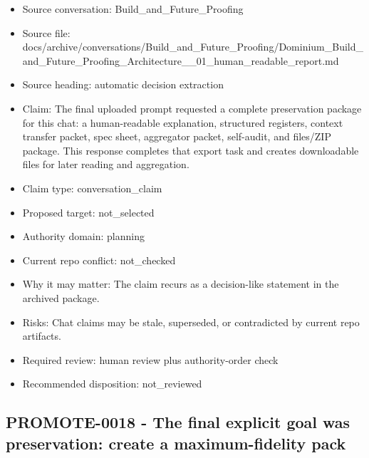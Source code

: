 \documentclass[11pt,a4paper]{report}
\begin{document}
\begin{itemize}
\item Source conversation: Build\_and\_Future\_Proofing
\item Source file: docs/archive/conversations/Build\_and\_Future\_Proofing/Dominium\_Build\_and\_Future\_Proofing\_Architecture\_\_01\_human\_readable\_report.md
\item Source heading: automatic decision extraction
\item Claim: The final uploaded prompt requested a complete preservation package for this chat: a human-readable explanation, structured registers, context transfer packet, spec sheet, aggregator packet, self-audit, and files/ZIP package. This response completes that export task and creates downloadable files for later reading and aggregation.
\item Claim type: conversation\_claim
\item Proposed target: not\_selected
\item Authority domain: planning
\item Current repo conflict: not\_checked
\item Why it may matter: The claim recurs as a decision-like statement in the archived package.
\item Risks: Chat claims may be stale, superseded, or contradicted by current repo artifacts.
\item Required review: human review plus authority-order check
\item Recommended disposition: not\_reviewed
\end{itemize}

\subsection{PROMOTE-0018 - The final explicit goal was preservation: create a maximum-fidelity pack}
\end{document}
